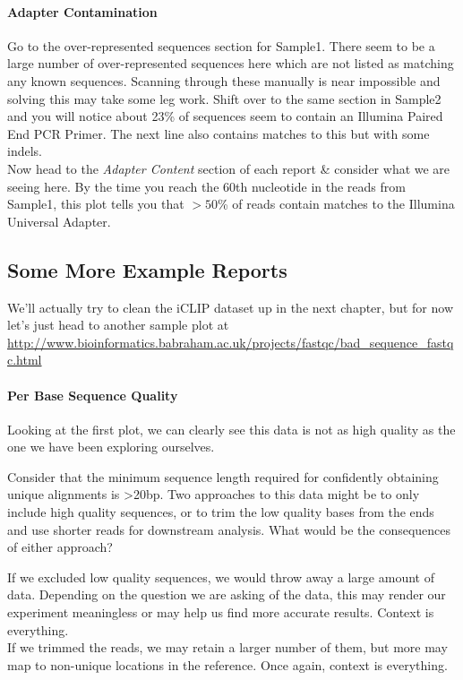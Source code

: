 \paragraph{Adapter Contamination}
Go to the over-represented sequences section for Sample1.
There seem to be a large number of over-represented sequences here which are not listed as matching any known sequences.
Scanning through these manually is near impossible and solving this may take some leg work.
Shift over to the same section in Sample2 and you will notice about 23\% of sequences seem to contain an Illumina Paired End PCR Primer.
The next line also contains matches to this but with some indels. \\

Now head to the \textit{Adapter Content} section of each report \& consider what we are seeing here.
By the time you reach the 60th nucleotide in the reads from Sample1, this plot tells you that $>50$\% of reads contain matches to the Illumina Universal Adapter.


\subsection{Some More Example Reports}
We'll actually try to clean the iCLIP dataset up in the next chapter, but for now let's just head to another sample plot at \url{http://www.bioinformatics.babraham.ac.uk/projects/fastqc/bad\_sequence\_fastqc.html}


\paragraph{Per Base Sequence Quality}
Looking at the first plot, we can clearly see this data is not as high quality as the one we have been exploring ourselves.

\begin{questions}
Consider that the minimum sequence length required for confidently obtaining unique alignments is >20bp.
Two approaches to this data might be to only include high quality sequences, or to trim the low quality bases from the ends and use shorter reads for downstream analysis.
What would be the consequences of either approach? \\
\begin{answer}
If we excluded low quality sequences, we would throw away a large amount of data.
Depending on the question we are asking of the data, this may render our experiment meaningless or may help us find more accurate results.
Context is everything. \\
If we trimmed the reads, we may retain a larger number of them, but more may map to non-unique locations in the reference.
Once again, context is everything.\\
\end{answer}
\end{questions}

